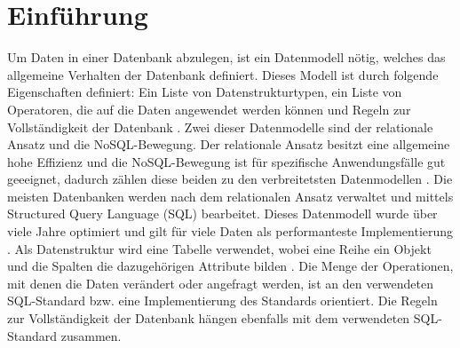 
\chapter{Einführung} %

\label{Kaptiel1} %


\newcommand{\keyword}[1]{\textit{#1}}
\newcommand{\tabhead}[1]{\textbf{#1}}
\newcommand{\code}[1]{\texttt{#1}}
\newcommand{\file}[1]{\texttt{\bfseries#1}}
\newcommand{\option}[1]{\texttt{\itshape#1}}

Um Daten in einer Datenbank abzulegen, ist ein Datenmodell nötig, welches das allgemeine Verhalten der Datenbank definiert. Dieses Modell ist durch folgende Eigenschaften definiert: Ein Liste von Datenstrukturtypen, ein Liste von Operatoren, die auf die Daten angewendet werden können und Regeln zur Vollständigkeit der Datenbank \parencite{codd1981data}. Zwei dieser Datenmodelle sind der relationale Ansatz und die NoSQL-Bewegung. Der relationale Ansatz besitzt eine allgemeine hohe Effizienz und die NoSQL-Bewegung ist für spezifische Anwendungsfälle gut geeeignet, dadurch zählen diese beiden zu den verbreitetsten Datenmodellen \parencite{vicknair2010comparison}. \newline
Die meisten Datenbanken werden nach dem relationalen Ansatz verwaltet und mittels Structured Query Language (SQL) bearbeitet. Dieses Datenmodell wurde über viele Jahre optimiert und gilt für viele Daten als performanteste Implementierung \parencite{miller2013graph}. Als Datenstruktur wird eine Tabelle verwendet, wobei eine Reihe ein Objekt  und die Spalten die dazugehörigen Attribute bilden \parencite{tatarinov2002storing}. Die Menge der Operationen, mit denen die Daten verändert oder angefragt werden, ist an den verwendeten SQL-Standard bzw. eine Implementierung des Standards orientiert. Die Regeln zur Vollständigkeit der Datenbank hängen ebenfalls mit dem verwendeten SQL-Standard zusammen.  \newline 
